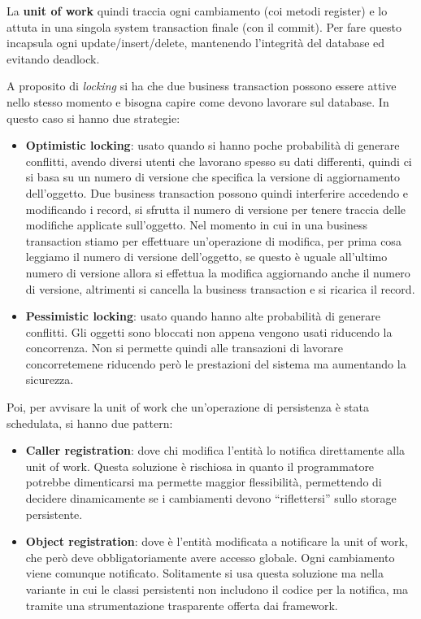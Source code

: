 La \textbf{unit of work} quindi traccia ogni cambiamento (coi metodi register) e
lo attuta in una singola system transaction finale (con il commit). Per fare
questo incapsula ogni update/insert/delete, mantenendo l'integrità del database
ed evitando deadlock.

A proposito di \textit{locking} si ha che due business transaction possono essere
attive nello stesso momento e bisogna capire come devono lavorare sul database.
In questo caso si hanno due strategie:
\begin{itemize}
      \item \textbf{Optimistic locking}: usato quando si hanno poche probabilità
            di generare conflitti, avendo diversi utenti che lavorano spesso su
            dati differenti, quindi ci si basa su un numero di versione che specifica
            la versione di aggiornamento dell'oggetto.
            Due business transaction possono quindi
            interferire accedendo e modificando i record, si sfrutta il numero
            di versione per tenere traccia delle modifiche applicate sull'oggetto.
            Nel momento in cui in una business transaction stiamo per effettuare
            un'operazione di modifica, per prima cosa leggiamo il numero di versione
            dell'oggetto, se questo è uguale all'ultimo numero di versione allora
            si effettua la modifica aggiornando anche il numero di versione,
            altrimenti si cancella la business transaction e si ricarica il record.
      \item \textbf{Pessimistic locking}: usato quando hanno alte probabilità di
            generare conflitti. Gli oggetti sono bloccati non appena vengono
            usati riducendo la concorrenza. Non si permette quindi alle
            transazioni di lavorare concorretemene riducendo però le prestazioni
            del sistema ma aumentando la sicurezza.
\end{itemize}
Poi, per avvisare la unit of work che un'operazione di persistenza è stata
schedulata, si hanno due pattern:
\begin{itemize}
      \item \textbf{Caller registration}: dove chi modifica l'entità lo notifica
            direttamente alla unit of work. Questa soluzione è rischiosa in quanto
            il programmatore potrebbe dimenticarsi ma permette maggior
            flessibilità, permettendo di decidere dinamicamente se i cambiamenti
            devono “riflettersi” sullo storage persistente.
      \item \textbf{Object registration}: dove è l'entità modificata a notificare
            la unit of work, che però deve obbligatoriamente avere accesso globale.
            Ogni cambiamento viene comunque notificato. Solitamente si usa questa
            soluzione ma nella variante in cui le classi persistenti non includono
            il codice per la notifica, ma tramite una strumentazione trasparente
            offerta dai framework.
\end{itemize}
